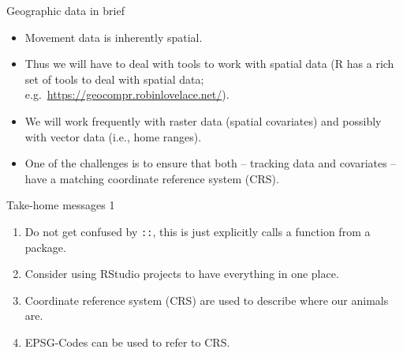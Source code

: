 \documentclass[ignorenonframetext,,t]{beamer}
\let\oldtextbf\textbf
\renewcommand{\textbf}[1]{\textcolor{spamwell}{\oldtextbf{#1}}}
\providecommand{\tightlist}{%
\setlength{\itemsep}{0pt}\setlength{\parskip}{0pt}}
\providecommand{\tightlist}{%
\setlength{\itemsep}{0pt}\setlength{\parskip}{0pt}}
\renewcommand{\tightlist}{\setlength{\itemsep}{1.4ex}\setlength{\parskip}{0pt}}
\begin{document}
\begin{frame}{Geographic data in brief}
\protect\hypertarget{geographic-data-in-brief}{}
\begin{itemize}
\item
  Movement data is inherently spatial.
\item
  Thus we will have to deal with tools to work with spatial data (R has
  a rich set of tools to deal with spatial data;
  e.g.~\url{https://geocompr.robinlovelace.net/}).
\item
  We will work frequently with raster data (spatial covariates) and
  possibly with vector data (i.e., home ranges).
\item
  One of the challenges is to ensure that both -- tracking data and
  covariates -- have a matching coordinate reference system (CRS).
\end{itemize}
\end{frame}

\begin{frame}
\end{frame}

\begin{frame}[fragile]{Take-home messages 1}
\protect\hypertarget{take-home-messages-1}{}
\begin{enumerate}
\tightlist
\item
  Do not get confused by \texttt{::}, this is just explicitly calls a
  function from a package.
\item
  Consider using RStudio projects to have everything in one place.
  \pause
\item
  Coordinate reference system (CRS) are used to describe where our
  animals are.
\item
  EPSG-Codes can be used to refer to CRS.
\end{enumerate}
\end{frame}
\end{document}
